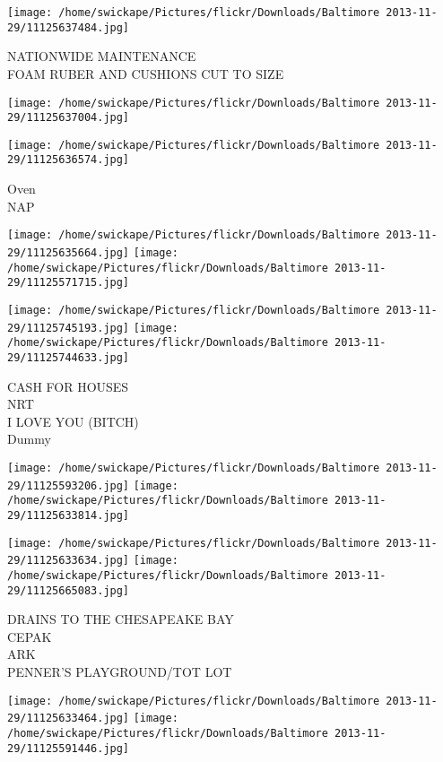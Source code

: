 \documentclass[10pt,letterpaper]{article}
\begin{document}
\vspace{0.25in}
\texttt{[image: /home/swickape/Pictures/flickr/Downloads/Baltimore 2013-11-29/11125637484.jpg]}

NATIONWIDE MAINTENANCE\\
FOAM RUBER AND CUSHIONS CUT TO SIZE\\
\pagebreak

\texttt{[image: /home/swickape/Pictures/flickr/Downloads/Baltimore 2013-11-29/11125637004.jpg]}

\vspace{0.25in}
\texttt{[image: /home/swickape/Pictures/flickr/Downloads/Baltimore 2013-11-29/11125636574.jpg]}

Oven\\
NAP\\
\pagebreak

\texttt{[image: /home/swickape/Pictures/flickr/Downloads/Baltimore 2013-11-29/11125635664.jpg]}
\texttt{[image: /home/swickape/Pictures/flickr/Downloads/Baltimore 2013-11-29/11125571715.jpg]}

\texttt{[image: /home/swickape/Pictures/flickr/Downloads/Baltimore 2013-11-29/11125745193.jpg]}
\texttt{[image: /home/swickape/Pictures/flickr/Downloads/Baltimore 2013-11-29/11125744633.jpg]}

CASH FOR HOUSES\\
NRT\\
I LOVE YOU (BITCH)\\
Dummy\\
\pagebreak

\texttt{[image: /home/swickape/Pictures/flickr/Downloads/Baltimore 2013-11-29/11125593206.jpg]}
\texttt{[image: /home/swickape/Pictures/flickr/Downloads/Baltimore 2013-11-29/11125633814.jpg]}

\texttt{[image: /home/swickape/Pictures/flickr/Downloads/Baltimore 2013-11-29/11125633634.jpg]}
\texttt{[image: /home/swickape/Pictures/flickr/Downloads/Baltimore 2013-11-29/11125665083.jpg]}

DRAINS TO THE CHESAPEAKE BAY\\
CEPAK\\
ARK\\
PENNER'S PLAYGROUND/TOT LOT\\
\pagebreak

\texttt{[image: /home/swickape/Pictures/flickr/Downloads/Baltimore 2013-11-29/11125633464.jpg]}
\texttt{[image: /home/swickape/Pictures/flickr/Downloads/Baltimore 2013-11-29/11125591446.jpg]}
\end{document}
